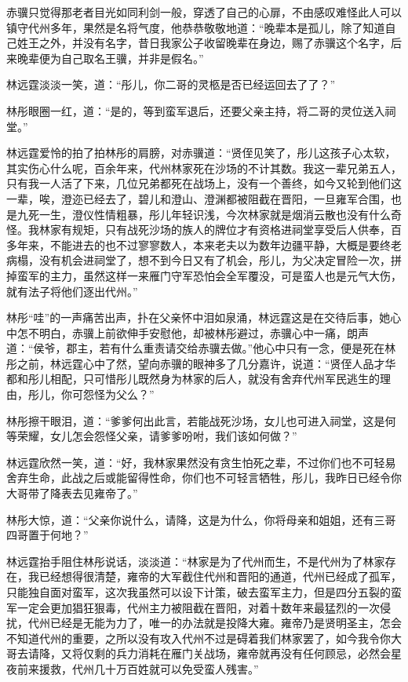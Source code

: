 赤骥只觉得那老者目光如同利剑一般，穿透了自己的心扉，不由感叹难怪此人可以镇守代州多年，果然是名将气度，他恭恭敬敬地道：“晚辈本是孤儿，除了知道自己姓王之外，并没有名字，昔日我家公子收留晚辈在身边，赐了赤骥这个名字，后来晚辈便为自己取名王骥，并非是假名。”

林远霆淡淡一笑，道：“彤儿，你二哥的灵柩是否已经运回去了了？”

林彤眼圈一红，道：“是的，等到蛮军退后，还要父亲主持，将二哥的灵位送入祠堂。”

林远霆爱怜的拍了拍林彤的肩膀，对赤骥道：“贤侄见笑了，彤儿这孩子心太软，其实伤心什么呢，百余年来，代州林家死在沙场的不计其数。我这一辈兄弟五人，只有我一人活了下来，几位兄弟都死在战场上，没有一个善终，如今又轮到他们这一辈，唉，澄迩已经去了，碧儿和澄山、澄渊都被阻截在晋阳，一旦雍军合围，也是九死一生，澄仪性情粗暴，彤儿年轻识浅，今次林家就是烟消云散也没有什么奇怪。我林家有规矩，只有战死沙场的族人的牌位才有资格进祠堂享受后人供奉，百多年来，不能进去的也不过寥寥数人，本来老夫以为数年边疆平静，大概是要终老病榻，没有机会进祠堂了，想不到今日又有了机会，彤儿，为父决定冒险一次，拼掉蛮军的主力，虽然这样一来雁门守军恐怕会全军覆没，可是蛮人也是元气大伤，就有法子将他们逐出代州。”

林彤“哇”的一声痛苦出声，扑在父亲怀中泪如泉涌，林远霆这是在交待后事，她心中怎不明白，赤骥上前欲伸手安慰他，却被林彤避过，赤骥心中一痛，朗声道：“侯爷，郡主，若有什么重责请交给赤骥去做。”他心中只有一念，便是死在林彤之前，林远霆心中了然，望向赤骥的眼神多了几分嘉许，说道：“贤侄人品才华都和彤儿相配，只可惜彤儿既然身为林家的后人，就没有舍弃代州军民逃生的理由，彤儿，你可怨怪为父么？”

林彤擦干眼泪，道：“爹爹何出此言，若能战死沙场，女儿也可进入祠堂，这是何等荣耀，女儿怎会怨怪父亲，请爹爹吩咐，我们该如何做？”

林远霆欣然一笑，道：“好，我林家果然没有贪生怕死之辈，不过你们也不可轻易舍弃生命，此战之后或能留得性命，你们也不可轻言牺牲，彤儿，我昨日已经令你大哥带了降表去见雍帝了。”

林彤大惊，道：“父亲你说什么，请降，这是为什么，你将母亲和姐姐，还有三哥四哥置于何地？”

林远霆抬手阻住林彤说话，淡淡道：“林家是为了代州而生，不是代州为了林家存在，我已经想得很清楚，雍帝的大军截住代州和晋阳的通道，代州已经成了孤军，只能独自面对蛮军，这次我虽然可以设下计策，破去蛮军主力，但是四分五裂的蛮军一定会更加猖狂狠毒，代州主力被阻截在晋阳，对着十数年来最猛烈的一次侵扰，代州已经是无能为力了，唯一的办法就是投降大雍。雍帝乃是贤明圣主，怎会不知道代州的重要，之所以没有攻入代州不过是碍着我们林家罢了，如今我令你大哥去请降，又将仅剩的兵力消耗在雁门关战场，雍帝就再没有任何顾忌，必然会星夜前来援救，代州几十万百姓就可以免受蛮人残害。”

